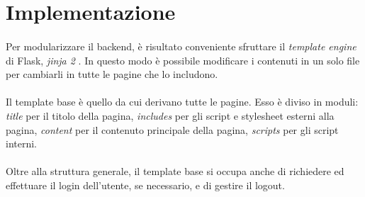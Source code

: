 \documentclass[12pt,a4paper,twoside,english,italian]{book}
\begin{document}
\section{Implementazione}

\paragraph{} Per modularizzare il backend, è risultato conveniente sfruttare il \emph{template engine} di Flask, \emph{jinja 2} \cite{jinja}. In questo modo è possibile modificare i contenuti in un solo file per cambiarli in tutte le pagine che lo includono.

\paragraph{} Il template base è quello da cui derivano tutte le pagine. Esso è diviso in moduli: \emph{title} per il titolo della pagina, \emph{includes} per gli script e stylesheet esterni alla pagina, \emph{content} per il contenuto principale della pagina, \emph{scripts} per gli script interni. 

\paragraph{} Oltre alla struttura generale, il template base si occupa anche di richiedere ed effettuare il login dell'utente, se necessario, e di gestire il logout. 
\end{document}
